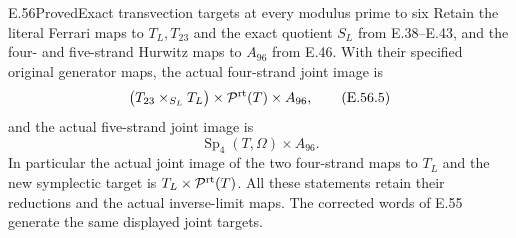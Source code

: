\begin{statement}{E.56}{Proved}{Exact transvection targets at every modulus prime to six}
Retain the literal Ferrari maps to $T_L,T_{23}$ and
the exact quotient $S_L$ from E.38--E.43, and the
four- and five-strand Hurwitz maps to $A_{96}$ from
E.46. With their specified original generator maps,
the actual four-strand joint image is
\[
 \bigl(T_{23}\times_{S_L}T_L\bigr)
                 \times\mathcal P^{\rm rt}(T)\times A_{96},
 \tag{E.56.5}
\]
and the actual five-strand joint image is
\[
                  \operatorname{Sp}_4(T,\Omega)\times A_{96}.
 \tag{E.56.6}
\]
In particular the actual joint image of the two
four-strand maps to $T_L$ and the new symplectic
target is $T_L\times\mathcal P^{\rm rt}(T)$.
All these statements retain their reductions and
the actual inverse-limit maps. The corrected words
of E.55 generate the same displayed joint targets.
\end{statement}

